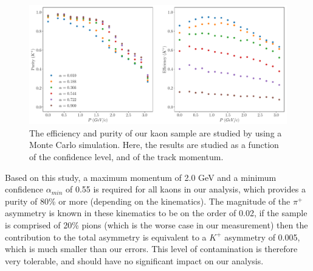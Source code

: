 \begin{figure}
	\centering
	\label{fig:kaon_efficiency_purity}
	\includegraphics[width=15cm]{image/plots/hadron-id/kaon_efficiency_purity.pdf}
	\caption{The efficiency and purity of our kaon sample are studied by using a Monte Carlo simulation.  Here, the results are studied as a function of the confidence level, and of the track momentum.}
\end{figure}

Based on this study, a maximum momentum of 2.0 GeV and a minimum confidence $\alpha_{min}$ of 0.55 is required for all kaons in our analysis, which provides a purity of 80\% or more (depending on the kinematics).  The magnitude of the $\pi^+$ asymmetry is known in these kinematics to be on the order of 0.02, if the sample is comprised of 20\% pions (which is the worse case in our measurement) then the contribution to the total asymmetry is equivalent to a $K^+$ asymmetry of 0.005, which is much smaller than our errors.  This level of contamination is therefore very tolerable, and should have no significant impact on our analysis.  



